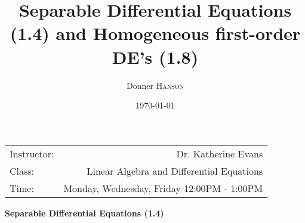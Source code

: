 \documentclass{article}
\begin{document}
\pagestyle{empty}

\title{Separable Differential Equations (1.4) and Homogeneous first-order DE’s (1.8)} %

\author{Donner \textsc{Hanson}} %

\date{\today} %

\maketitle %

\begin{center}
\begin{tabular}{l r}
Instructor: & Dr. Katherine Evans\\%
Class: & Linear Algebra and Differential Equations\\ %
Time: & Monday, Wednesday, Friday 12:00PM - 1:00PM\\
\end{tabular}
\end{center}


\begin{center}
\begin{LARGE}\textbf{Separable Differential Equations (1.4) }
 \end{LARGE}
 \end{center}




\end{document}
